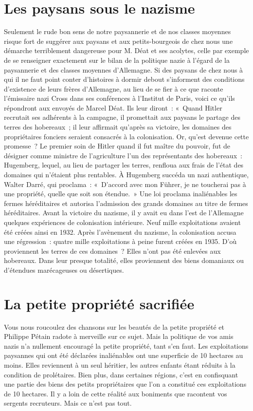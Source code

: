 \documentclass[french,twoside]{book} %
\begin{document}
\section[{Les paysans sous le nazisme}]{Les paysans sous le nazisme}
\noindent Seulement le rude bon sens de notre paysannerie et de nos classes moyennes risque fort de suggérer aux paysans et aux petits-bourgeois de chez nous une démarche terriblement dangereuse pour M. Déat et ses acolytes, celle par exemple de se renseigner exactement sur le bilan de la politique nazie à l’égard de la paysannerie et des classes moyennes d’Allemagne. Si des paysans de chez nous à qui il ne faut point conter d’histoires à dormir debout s’informent des conditions d’existence de leurs frères d’Allemagne, au lieu de se fier à ce que raconte l’émissaire nazi Cross dans ses conférences à l’Institut de Paris, voici ce qu’ils répondront aux envoyés de Marcel Déat. Ils leur diront : « Quand Hitler recrutait ses adhérents à la campagne, il promettait aux paysans le partage des terres des hobereaux ; il leur affirmait qu’après sa victoire, les domaines des propriétaires fonciers seraient consacrés à la colonisation. Or, qu’est devenue cette promesse ? Le premier soin de Hitler quand il fut maître du pouvoir, fut de désigner comme ministre de l’agriculture l’un des représentants des hobereaux : Hugemberg, lequel, au lieu de partager les terres, renfloua aux frais de l’état des domaines qui n’étaient plus rentables. À Hugemberg succéda un nazi authentique, Walter Darré, qui proclama : « D’accord avec mon Führer, je ne toucherai pas à une propriété, quelle que soit son étendue. » Une loi proclama inaliénables les fermes héréditaires et autorisa l’admission des grands domaines au titre de fermes héréditaires. Avant la victoire du nazisme, il y avait eu dans l’est de l’Allemagne quelques expériences de colonisation intérieure. Neuf mille exploitations avaient été créées ainsi en 1932. Après l’avènement du nazisme, la colonisation accusa une régression : quatre mille exploitations à peine furent créées en 1935. D’où proviennent les terres de ces domaines ? Elles n’ont pas été enlevées aux hobereaux. Dans leur presque totalité, elles proviennent des biens domaniaux ou d’étendues marécageuses ou désertiques.
\section[{La petite propriété sacrifiée}]{La petite propriété sacrifiée}
\noindent Vous nous roucoulez des chansons sur les beautés de la petite propriété et Philippe Pétain radote à merveille sur ce sujet. Mais la politique de vos amis nazis n’a nullement encouragé la petite propriété, tant s’en faut. Les exploitations paysannes qui ont été déclarées inaliénables ont une superficie de 10 hectares au moins. Elles reviennent à un seul héritier, les autres enfants étant réduits à la condition de prolétaires. Bien plus, dans certaines régions, c’est en confisquant une partie des biens des petits propriétaires que l’on a constitué ces exploitations de 10 hectares. Il y a loin de cette réalité aux boniments que racontent vos sergents recruteurs. Mais ce n’est pas tout.
\end{document}

